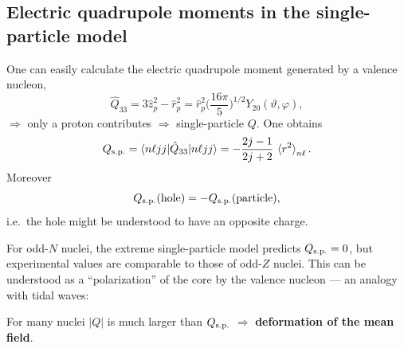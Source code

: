 \documentclass[11pt,a4paper]{article}
\newcommand{\op}[1]{\hat{#1}}
\begin{document}
\subsection{Electric quadrupole moments in the single-particle model}
One can easily calculate the electric quadrupole moment generated by a valence nucleon,
\[
\op Q_{33}=3\op z_p^2-\op r_p^2=\op r_p^2\Big(\frac{16\pi}{5}\Big)^{1/2}Y_{20}(\vartheta,\varphi),
\]
$\Rightarrow$ only a proton contributes $\Rightarrow$ single-particle $Q$. One obtains
\[
Q_{\rm s.p.}=\braket{n\ell jj|\op Q_{33}|n\ell jj}=-\frac{2j-1}{2j+2}\,\braket{r^2}_{n\ell}.
\]
Moreover
\[
Q_{\rm s.p.}(\text{hole})=-Q_{\rm s.p.}(\text{particle}),
\]
i.e.\ the hole might be understood to have an opposite charge.

For odd-$N$ nuclei, the extreme single-particle model predicts $Q_{\rm s.p.}=0$, but experimental values are comparable to those of odd-$Z$ nuclei. This can be understood as a ``polarization'' of the core by the valence nucleon --- an analogy with tidal waves:
\begin{center}
\end{center}
For many nuclei $|Q|$ is much larger than $Q_{\rm s.p.}$ $\Rightarrow$ \textbf{deformation of the mean field}.

\end{document}
